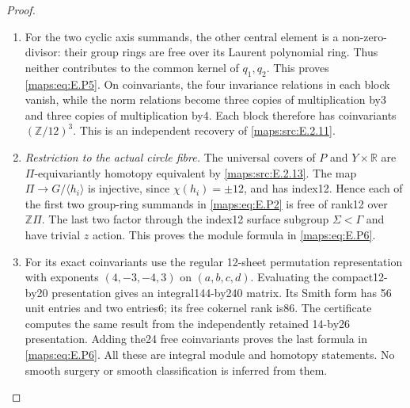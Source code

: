 \begin{proof}
\begin{enumerate}[label=\arabic*.,leftmargin=*]
\item For the two cyclic axis summands, the other
central element is a non-zero-divisor: their
group rings are free over its Laurent polynomial
ring. Thus neither contributes to the common
kernel of $q_1,q_2$. This proves \eqref{maps:eq:E.P5}. On
coinvariants, the four invariance relations in
each block vanish, while the norm relations
become three copies of multiplication by3 and
three copies of multiplication by4. Each block
therefore has coinvariants $(\mathbb Z/12)^3$.
This is an independent recovery of \ref{maps:src:E.2.11}.

\item \emph{Restriction to the actual circle fibre.}
The universal covers of $P$ and $Y\times\mathbb R$
are $\Pi$-equivariantly homotopy equivalent by
\ref{maps:src:E.2.13}. The map $\Pi\to G/\langle h_i\rangle$
is injective, since $\chi(h_i)=\pm12$, and has
index12. Hence each of the first two group-ring
summands in \eqref{maps:eq:E.P2} is free of rank12 over
$\mathbb Z\Pi$. The last two factor through the
index12 surface subgroup $\Sigma<\Gamma$ and
have trivial $z$ action. This proves the module
formula in \eqref{maps:eq:E.P6}.

\item For its exact coinvariants use the regular
12-sheet permutation representation with
exponents $(4,-3,-4,3)$ on $(a,b,c,d)$.
Evaluating the compact12-by20 presentation gives
an integral144-by240 matrix. Its Smith form has
56 unit entries and two entries6; its free
cokernel rank is86. The certificate computes
the same result from the independently retained
14-by26 presentation. Adding the24 free
coinvariants proves the last formula in \eqref{maps:eq:E.P6}.
All these are integral module and homotopy
statements. No smooth surgery or smooth
classification is inferred from them.
\end{enumerate}
\end{proof}


